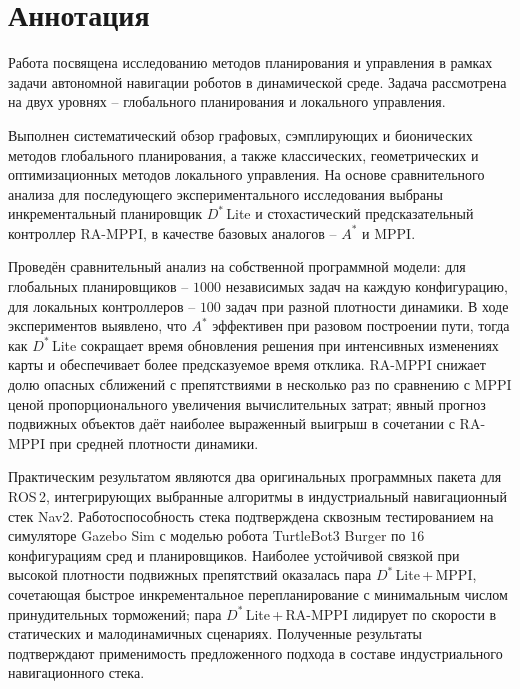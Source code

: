 \documentclass[a4paper,12pt]{extarticle}
\begin{document}
    

    \newpage
    \setcounter{page}{2}

    {
        \hypersetup{linkcolor=black}
        \tableofcontents
    }

    \newpage

    \section*{Аннотация}

    Работа посвящена исследованию методов планирования и управления в рамках задачи автономной навигации роботов в динамической среде. Задача рассмотрена на двух уровнях -- глобального планирования и локального управления.

    Выполнен систематический обзор графовых, сэмплирующих и бионических методов глобального планирования, а также классических, геометрических и оптимизационных методов локального управления. На основе сравнительного анализа для последующего экспериментального исследования выбраны инкрементальный планировщик $D^*$\,Lite и стохастический предсказательный контроллер RA-MPPI, в качестве базовых аналогов -- $A^*$ и MPPI.

    Проведён сравнительный анализ на собственной программной модели: для глобальных планировщиков -- $1000$ независимых задач на каждую конфигурацию, для локальных контроллеров -- $100$ задач при разной плотности динамики. В ходе экспериментов выявлено, что $A^*$ эффективен при разовом построении пути, тогда как $D^*$\,Lite сокращает время обновления решения при интенсивных изменениях карты и обеспечивает более предсказуемое время отклика. RA-MPPI снижает долю опасных сближений с препятствиями в несколько раз по сравнению с MPPI ценой пропорционального увеличения вычислительных затрат; явный прогноз подвижных объектов даёт наиболее выраженный выигрыш в сочетании с RA-MPPI при средней плотности динамики.

    Практическим результатом являются два оригинальных программных пакета для ROS\,2, интегрирующих выбранные алгоритмы в индустриальный навигационный стек Nav2. Работоспособность стека подтверждена сквозным тестированием на симуляторе Gazebo Sim с моделью робота TurtleBot3 Burger по $16$ конфигурациям сред и планировщиков. Наиболее устойчивой связкой при высокой плотности подвижных препятствий оказалась пара $D^*$\,Lite\,+\,MPPI, сочетающая быстрое инкрементальное перепланирование с минимальным числом принудительных торможений; пара $D^*$\,Lite\,+\,RA-MPPI лидирует по скорости в статических и малодинамичных сценариях. Полученные результаты подтверждают применимость предложенного подхода в составе индустриального навигационного стека.
\end{document}
